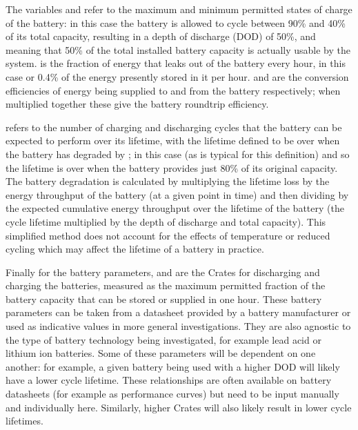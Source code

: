 \documentclass[letterpaper,10pt,english]{sphinxmanual}
\begin{document}
\sphinxAtStartPar
The variables  and 
refer to the maximum and minimum permitted states of charge of the
battery: in this case the battery is allowed to cycle between 90\% and
40\% of its total capacity, resulting in a depth of discharge (DOD) of
50\%, and meaning that 50\% of the total installed battery capacity is
actually usable by the system.  is the fraction of
energy that leaks out of the battery every hour, in this case 
or 0.4\% of the energy presently stored in it per hour.
 and  are the
conversion efficiencies of energy being supplied to and from the battery
respectively; when multiplied together these give the battery round\sphinxhyphen{}trip
efficiency.

\sphinxAtStartPar
{} refers to the number of charging and
discharging cycles that the battery can be expected to perform over its
lifetime, with the lifetime defined to be over when the battery has
degraded by ; in this case
 (as is typical for this definition) and
so the lifetime is over when the battery provides just 80\% of its
original capacity. The battery degradation is calculated by multiplying
the lifetime loss by the energy throughput of the battery (at a given
point in time) and then dividing by the expected cumulative energy
throughput over the lifetime of the battery (the cycle lifetime
multiplied by the depth of discharge and total capacity). This
simplified method does not account for the effects of temperature or
reduced cycling which may affect the lifetime of a battery in practice.

\sphinxAtStartPar
Finally for the battery parameters,  and
 are the C\sphinxhyphen{}rates for discharging and charging
the batteries, measured as the maximum permitted fraction of the battery
capacity that can be stored or supplied in one hour. These battery
parameters can be taken from a datasheet provided by a battery
manufacturer or used as indicative values in more general
investigations. They are also agnostic to the type of battery technology
being investigated, for example lead acid or lithium ion batteries. Some
of these parameters will be dependent on one another: for example, a
given battery being used with a higher DOD will likely have a lower
cycle lifetime. These relationships are often available on battery
datasheets (for example as performance curves) but need to be input
manually and individually here. Similarly, higher C\sphinxhyphen{}rates will also
likely result in lower cycle lifetimes.
\end{document}
